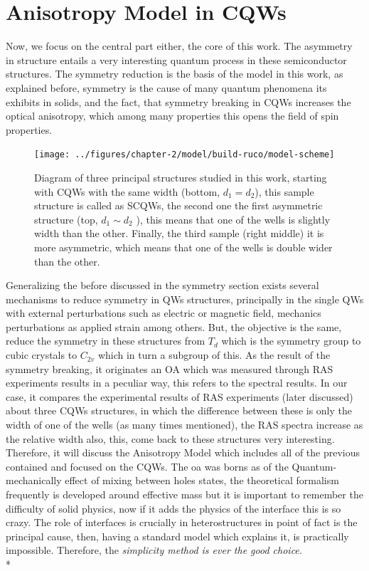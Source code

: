\section{Anisotropy Model in CQWs}
\label{subsec:chapter-2-anisotropy-model}
\vspace{-10mm} 
Now, we focus on the central part either, the core of this work. The asymmetry in structure entails a very interesting quantum process in these semiconductor structures. The symmetry reduction is the basis of the model in this work, as explained before, symmetry is the cause of many quantum phenomena its exhibits in solids, and the fact, that symmetry breaking in \gls{CQWs} increases the optical anisotropy, which among many properties this opens the field of spin properties\cite{sivalertporn2012direct,averkiev2006spin,kotova2016optical,schonhuber2014inelastic,tronc2012spin}.\\
\begin{figure}[b]
	\centering
	\texttt{[image: ../figures/chapter-2/model/build-ruco/model-scheme]}
	\caption{Diagram of three principal structures studied in this work, starting with CQWs with the same width (bottom, $d_{1}=d_{2}$), this sample structure is called as SCQWs, the second one the first asymmetric structure (top, $d_{1}\sim d_{2}$ ), this means that one of the wells is slightly width than the other. Finally, the third sample (right middle) it is more asymmetric, which means that one of the wells is double wider than the other.    }
	\label{fig:chapter-2-anisotropy-model-samples-studied}
\end{figure}
Generalizing the before discussed in the symmetry section exists several mechanisms to reduce symmetry in QWs structures, principally in the single QWs with external perturbations such as electric or magnetic field, mechanics perturbations as applied strain among others.  But, the objective is the same, reduce the symmetry in these structures from  $T_{d}$ which is the symmetry group to cubic crystals to $C_{2v}$ which in turn a  subgroup of this. As the result of the symmetry breaking,  it originates an OA which was measured through \gls{RAS} experiments results in a peculiar way, this refers to the spectral results. In our case, it compares the experimental results of \gls{RAS} experiments (later discussed) about three CQWs structures, in which the difference between these is only the width of one of the wells (as many times mentioned), the \gls{RAS} spectra increase as the relative width also,  this, come back to these structures very interesting.  Therefore, it will discuss the Anisotropy Model which includes all of the previous contained and focused on the \gls{CQWs}. The \gls{oa} was borns as of the Quantum-mechanically effect of mixing between holes states, the theoretical formalism frequently is developed around effective mass but it is important to remember the difficulty of solid physics, now if it adds the physics of the interface this is so crazy. The role of interfaces is crucially in heterostructures in point of fact is the principal cause, then, having a standard model which explains it, is practically impossible. Therefore, the \emph{simplicity method is ever the good choice.}\\*
